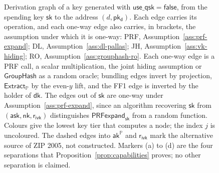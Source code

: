 \documentclass[11pt,a4paper]{article}
\theoremstyle{definition}
\newcommand{\PP}{\mathbb{P}}
\newcommand{\CommitIvk}{\ensuremath{\mathsf{Commit}^{\mathsf{ivk}}}}
\newcommand{\Extract}{\ensuremath{\mathsf{Extract}}}
\newcommand{\GroupHash}{\ensuremath{\mathsf{GroupHash}}}
\newcommand{\ask}{\ensuremath{\mathsf{ask}}}
\newcommand{\aksym}{\ensuremath{\mathsf{ak}}}
\newcommand{\nksym}{\ensuremath{\mathsf{nk}}}
\newcommand{\ivk}{\ensuremath{\mathsf{ivk}}}
\newcommand{\dk}{\ensuremath{\mathsf{dk}}}
\newcommand{\pkd}{\ensuremath{\mathsf{pk_d}}}
\newcommand{\gd}{\ensuremath{\mathsf{g_d}}}
\newcommand{\rivk}{\ensuremath{\mathsf{r_{ivk}}}}
\begin{document}
\begin{figure}[tp]
\caption{Derivation graph of a key generated with
$\mathsf{use\_qsk} = \mathsf{false}$, from the spending key $\mathsf{sk}$ to
the address $(d, \pkd)$. Each edge carries its operation, and each one-way
edge also carries, in brackets, the assumption under which it is one-way:
PRF,
Assumption~\ref{ass:prf-expand}; DL, Assumption~\ref{ass:dl-pallas}; JH,
Assumption~\ref{ass:vk-hiding}; RO, Assumption~\ref{ass:grouphash-ro}. Each
one-way edge is a PRF call, a scalar multiplication, the joint hiding
assumption or $\GroupHash$ as a random oracle; bundling edges invert by
projection, $\Extract_{\PP}$ by the even-$y$ lift, and the FF1 edge is
inverted by the holder of $\dk$. The edges out of $\mathsf{sk}$ are one-way
under Assumption~\ref{ass:prf-expand}, since an algorithm recovering
$\mathsf{sk}$ from $(\ask, \nksym, \rivk)$ distinguishes
$\mathsf{PRFexpand}_{\mathsf{sk}}$ from a random function. Colours give the
lowest key tier that computes a node; the index $j$ is uncoloured. The
dashed edges into $\aksym^{\PP}$ and $\rivk$ mark the alternative source of
ZIP 2005, not constructed. Markers (a) to (d) are the four separations that
Proposition~\ref{prop:capabilities} proves; no other separation is
claimed.}
\label{fig:keys}
\end{figure}
\end{document}
